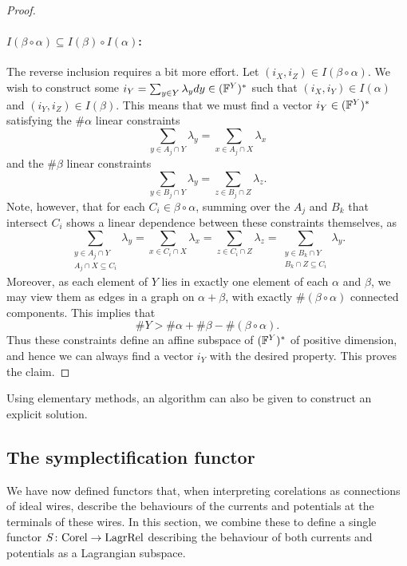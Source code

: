 \begin{proof}
\paragraph{$I(\beta\circ\alpha) \subseteq I(\beta) \circ I(\alpha)$:} The
reverse inclusion requires a bit more effort. Let $(i_X,i_Z) \in
I(\beta\circ\alpha)$. We wish to construct some $i_Y = \sum_{y \in Y} \lambda_y
dy \in ({\mathbb F}^{Y})^\ast$ such that $(i_X,i_Y) \in I(\alpha)$ and $(i_Y,i_Z) \in
I(\beta)$.  This means that we must find a vector $i_Y \in ({\mathbb F}^{Y})^\ast$
satisfying the $\#\alpha$ linear constraints
\[
  \sum_{y \in A_j \cap Y} \lambda_y = \sum_{x \in A_j \cap X} \lambda_x
\]
and the $\#\beta$ linear constraints
\[
  \sum_{y \in B_j \cap Y} \lambda_y = \sum_{z \in B_j \cap Z} \lambda_z.
\]
Note, however, that for each $C_i \in \beta\circ\alpha$, summing over the $A_j$
and $B_k$ that intersect $C_i$ shows a linear dependence between these constraints
themselves, as
\[
  \sum_{\substack{y \in A_j \cap Y \\ A_j \cap X \subseteq C_i}} \lambda_y =
  \sum_{x \in C_i \cap X} \lambda_x = \sum_{z \in C_i \cap Z}
  \lambda_z = \sum_{\substack{y \in B_k \cap Y \\ B_k \cap Z \subseteq C_i}}
  \lambda_y.
\]
Moreover, as each element of $Y$ lies in exactly one element of each $\alpha$
and $\beta$, we may view them as edges in a graph on $\alpha+\beta$, with
exactly $\#(\beta\circ\alpha)$ connected components. This implies that
\[
  \# Y > \#\alpha + \#\beta -\#(\beta\circ\alpha).
\]
Thus these constraints define an affine subspace of $({\mathbb F}^{Y})^\ast$ of positive
dimension, and hence we can always find a vector $i_Y$ with the desired
property. This proves the claim. 
\end{proof}

Using elementary methods, an algorithm can also
be given to construct an explicit solution.

\subsection{The symplectification functor}

We have now defined functors that, when interpreting corelations as connections
of ideal wires, describe the behaviours of the currents and potentials at the
terminals of these wires. In this section, we combine these to define a single
functor $S{\colon} \mathrm{Corel} \to \mathrm{LagrRel}$ describing the behaviour of both
currents and potentials as a Lagrangian subspace.

